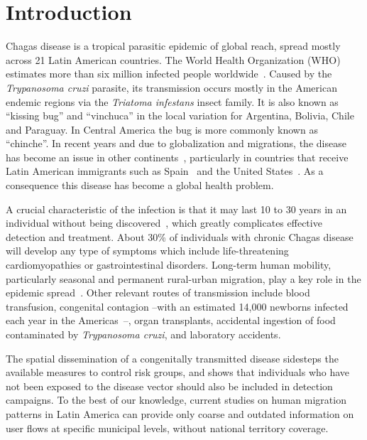\chapter{Introduction}\label{ch:introduction}


Chagas disease is a tropical parasitic epidemic of global reach, spread mostly across 21 Latin American countries. The World Health Organization (WHO) estimates more than six million infected people worldwide~\citep{who2016}. Caused by the \textit{Trypanosoma cruzi} parasite, its transmission occurs mostly in the American endemic regions via the \textit{Triatoma infestans} insect family. It is also known as ``kissing bug'' and ``vinchuca'' in the local variation for Argentina, Bolivia, Chile and Paraguay. In Central America the bug is more commonly known as ``chinche''.
In recent years and due to globalization and migrations, the disease has become an %
issue in other continents~\citep{schmunis2010chagas},
particularly in countries that receive Latin American immigrants such as Spain~\citep{navarro2012chagas} and the United States~\citep{hotez2013unfolding}.
As a consequence this disease has become a global health problem.


A crucial characteristic of the infection is that it may last 10 to 30 years in an individual without being discovered~\citep{rassi2012american}, which greatly complicates effective detection and treatment.
About 30\% of individuals with chronic Chagas disease will develop any type of symptoms which include life-threatening cardiomyopathies or gastrointestinal disorders.
Long-term human mobility, particularly seasonal and permanent rural-urban migration, play a key role in the epidemic spread~\citep{briceno2009chagas}.
Other relevant routes of transmission include blood transfusion, congenital contagion --with an estimated 14,000 newborns infected each year in the Americas~\citep{OPS2006chagas}--, organ transplants, accidental ingestion of food contaminated by \textit{Trypanosoma cruzi}, and laboratory accidents.

The spatial dissemination of a congenitally transmitted disease sidesteps the available measures to control risk groups, and shows that individuals who have not been exposed to the disease vector should also be included in detection campaigns.
To the best of our knowledge, current studies on human migration patterns in Latin America can provide only coarse and outdated information on user flows at specific municipal levels, without national territory coverage.

